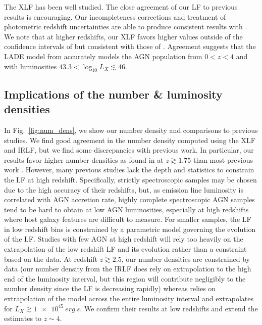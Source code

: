 \documentclass[twocolumn, trackchanges]{aastex63}
\begin{document}
The XLF has been well studied.
The close agreement of our LF to previous results is encouraging.
Our incompleteness corrections and treatment of photometric redshift uncertainties are able to produce consistent results with \cite{ranalli_210_2016, aird_evolution_2010}.
We note that at higher redshifts, our XLF favors higher values outside of the confidence intervals of \cite{aird_evolution_2010} but consistent with those of \cite{ranalli_210_2016}.
Agreement suggests that the LADE model from \cite{ranalli_210_2016} accurately models the AGN population from $0<z<4$ and with luminosities $43.3 < \log_{10}L_{X} \lesssim 46$.

\subsection{Implications of the number \& luminosity densities}
In Fig.~\ref{fig:num_dens}, we show our number density and comparisons to previous studies.
We find good agreement in the number density computed using the XLF and IRLF, but we find some discrepancies with previous work.
In particular, our results favor higher number densities as found in \cite[and]{lacy_spitzer_2015, ranalli_210_2016} at $z\gtrsim1.75$ than most previous work \citep{yencho_optx_2009, silverman_luminosity_2008, aird_evolution_2010}.
However, many previous studies lack the depth and statistics to constrain the LF at high redshift.
Specifically, strictly spectroscopic samples may be chosen due to the high accuracy of their redshifts, but, as emission line luminosity is correlated with AGN accretion rate, highly complete spectroscopic AGN samples tend to be hard to obtain at low AGN luminosities, especially at high redshifts where host galaxy features are difficult to measure.
For smaller samples, the LF in low redshift bins is constrained by a parametric model governing the evolution of the LF.
Studies with few AGN at high redshift will rely too heavily on the extrapolation of the low redshift LF and its evolution rather than a constraint based on the data.
At redshift $z\gtrsim2.5$, our number densities are constrained by data (our number density from the IRLF does rely on extrapolation to the high end of the luminosity interval, but this region will contribute negligibly to the number density since the LF is decreasing rapidly) whereas \cite{lacy_spitzer_2015} relies on extrapolation of the model across the entire luminosity interval and \cite{ranalli_210_2016} extrapolates for $L_{X}\gtrsim\SI{1e45}{erg~s}$.
We confirm their results at low redshifts and extend the estimates to $z\sim4$.
\end{document}
